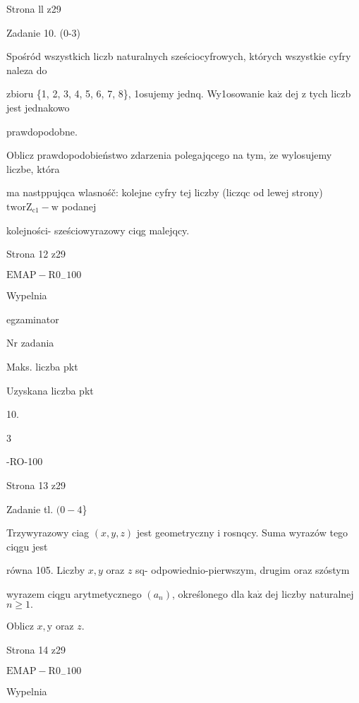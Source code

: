 \documentclass[a4paper,12pt]{article}
\begin{document}
Strona ll z29





Zadanie 10. (0-3)

Spośród wszystkich liczb naturalnych sześciocyfrowych, których wszystkie cyfry naleza do

zbioru \{1, 2, 3, 4, 5, 6, 7, 8\}, 1osujemy jednq. Wy1osowanie $\mathrm{k}\mathrm{a}\dot{\mathrm{z}}$ dej z tych liczb jest jednakowo

prawdopodobne.

Oblicz prawdopodobieństwo zdarzenia polegajqcego na tym, $\dot{\mathrm{z}}\mathrm{e}$ wylosujemy liczbe, która

ma nastppujqca wlasnośč: kolejne cyfry tej liczby (liczqc od lewej strony) $\mathrm{t}\mathrm{w}\mathrm{o}\mathrm{r}\mathrm{Z}_{\mathrm{c}1}-\mathrm{w}$ podanej

kolejności- sześciowyrazowy ciqg malejqcy.

Strona 12 z29

$\mathrm{E}\mathrm{M}\mathrm{A}\mathrm{P}-\mathrm{R}0_{-}100$





Wypelnia

egzaminator

Nr zadania

Maks. liczba pkt

Uzyskana liczba pkt

10.

3

-RO-100

Strona 13 z29





Zadanie tl. $(0-4$\}

Trzywyrazowy ciag $(x,y,z)$ jest geometryczny i rosnqcy. Suma wyrazów tego ciqgu jest

równa 105. Liczby $x, y$ oraz $z$ sq- odpowiednio-pierwszym, drugim oraz szóstym

wyrazem ciqgu arytmetycznego $(a_{n})$, określonego dla $\mathrm{k}\mathrm{a}\dot{\mathrm{z}}$ dej liczby naturalnej $n\geq 1.$

Oblicz $x, \mathrm{y}$ oraz $z.$

Strona 14 z29

$\mathrm{E}\mathrm{M}\mathrm{A}\mathrm{P}-\mathrm{R}0_{-}100$





Wypelnia
\end{document}
